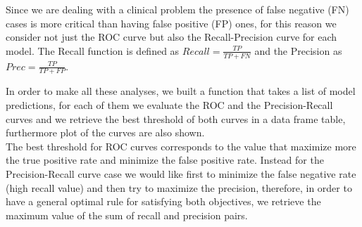\documentclass[
]{article}
\begin{document}
Since we are dealing with a clinical problem the presence of false
negative (FN) cases is more critical than having false positive (FP)
ones, for this reason we consider not just the ROC curve but also the
Recall-Precision curve for each model. The Recall function is
defined as \(Recall = \frac{TP}{TP + FN}\) and the Precision as
\(Prec= \frac{TP}{TP + FP}\).

In order to make all these analyses, we built a function that takes a
list of model predictions, for each of them we evaluate the ROC and the
Precision-Recall curves and we retrieve the best threshold of both
curves in a data frame table, furthermore plot of the curves are also
shown.\\
The best threshold for ROC curves corresponds to the value that maximize
more the true positive rate and minimize the false positive rate.
Instead for the Precision-Recall curve case we would like first to
minimize the false negative rate (high recall value) and then try to
maximize the precision, therefore, in order to have a general optimal
rule for satisfying both objectives, we retrieve the maximum value of
the sum of recall and precision pairs.
\end{document}

